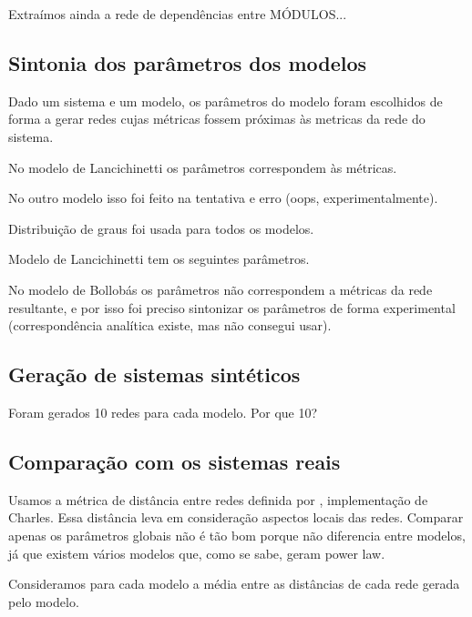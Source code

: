 \documentclass{acm_proc_article-sp}
\begin{document}
Extraímos ainda a rede de dependências entre MÓDULOS...

\subsection{Sintonia dos parâmetros dos modelos}

Dado um sistema e um modelo, os parâmetros do modelo foram escolhidos de forma a gerar redes cujas métricas fossem próximas às metricas da rede do sistema.

No modelo de Lancichinetti os parâmetros correspondem às métricas.

No outro modelo isso foi feito na tentativa e erro (oops, experimentalmente).

Distribuição de graus foi usada para todos os modelos.

Modelo de Lancichinetti tem os seguintes parâmetros.

No modelo de Bollobás os parâmetros não correspondem a métricas da rede resultante, e por isso foi preciso sintonizar os parâmetros de forma experimental (correspondência analítica existe, mas não consegui usar).

\subsection{Geração de sistemas sintéticos}

Foram gerados 10 redes para cada modelo. Por que 10?

\subsection{Comparação com os sistemas reais}

Usamos a métrica de distância entre redes definida por \cite{Andrade2008}, implementação de Charles. Essa distância leva em consideração aspectos locais das redes. Comparar apenas os parâmetros globais não é tão bom porque não diferencia entre modelos, já que existem vários modelos que, como se sabe, geram power law.


Consideramos para cada modelo a média entre as distâncias de cada rede gerada pelo modelo.
\end{document}
